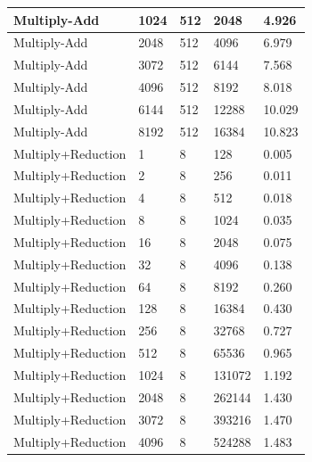 \documentclass{article}
\begin{document}
\begin{longtable}{|l|l|l|l|l|}
Multiply-Add       & 1024 & 512         & 2048              & 4.926             \\ \hline
Multiply-Add       & 2048 & 512         & 4096              & 6.979             \\ \hline
Multiply-Add       & 3072 & 512         & 6144              & 7.568             \\ \hline
Multiply-Add       & 4096 & 512         & 8192              & 8.018             \\ \hline
Multiply-Add       & 6144 & 512         & 12288             & 10.029            \\ \hline
Multiply-Add       & 8192 & 512         & 16384             & 10.823            \\ \hline
Multiply+Reduction & 1    & 8           & 128               & 0.005             \\ \hline
Multiply+Reduction & 2    & 8           & 256               & 0.011             \\ \hline
Multiply+Reduction & 4    & 8           & 512               & 0.018             \\ \hline
Multiply+Reduction & 8    & 8           & 1024              & 0.035             \\ \hline
Multiply+Reduction & 16   & 8           & 2048              & 0.075             \\ \hline
Multiply+Reduction & 32   & 8           & 4096              & 0.138             \\ \hline
Multiply+Reduction & 64   & 8           & 8192              & 0.260             \\ \hline
Multiply+Reduction & 128  & 8           & 16384             & 0.430             \\ \hline
Multiply+Reduction & 256  & 8           & 32768             & 0.727             \\ \hline
Multiply+Reduction & 512  & 8           & 65536             & 0.965             \\ \hline
Multiply+Reduction & 1024 & 8           & 131072            & 1.192             \\ \hline
Multiply+Reduction & 2048 & 8           & 262144            & 1.430             \\ \hline
Multiply+Reduction & 3072 & 8           & 393216            & 1.470             \\ \hline
Multiply+Reduction & 4096 & 8           & 524288            & 1.483             \\ \hline

\end{longtable}
\end{document}
